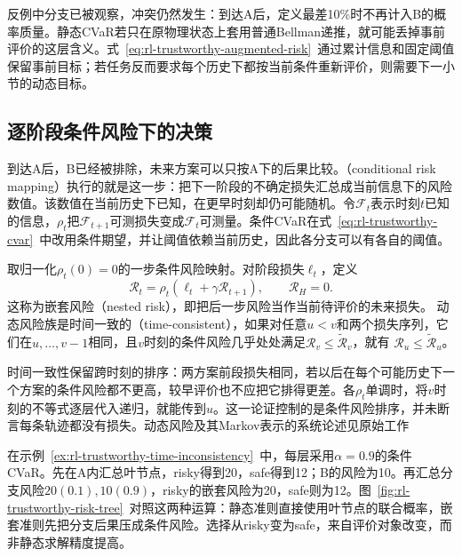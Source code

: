 反例中分支已被观察，冲突仍然发生：到达A后，定义最差10\%时不再计入B的概率质量。静态CVaR若只在原物理状态上套用普通Bellman递推，就可能丢掉事前评价的这层含义。式~\eqref{eq:rl-trustworthy-augmented-risk}~通过累计信息和固定阈值保留事前目标；若任务反而要求每个历史下都按当前条件重新评价，则需要下一小节的动态目标。

\subsection{逐阶段条件风险下的决策}
\label{sec:rl-trustworthy-dynamic-risk}

到达A后，B已经被排除，未来方案可以只按A下的后果比较。（conditional risk mapping）执行的就是这一步：把下一阶段的不确定损失汇总成当前信息下的风险数值。该数值在当前历史下已知，在更早时刻却仍可能随机。令$\mathcal F_t$表示时刻$t$已知的信息，$\rho_t$把$\mathcal F_{t+1}$可测损失变成$\mathcal F_t$可测量。条件CVaR在式~\eqref{eq:rl-trustworthy-cvar}~中改用条件期望，并让阈值依赖当前历史，因此各分支可以有各自的阈值。

\begin{definition}[嵌套风险与时间一致性]
  \label{def:rl-trustworthy-time-consistency}
  取归一化$\rho_t(0)=0$的一步条件风险映射。对阶段损失$\ell_t$，定义
  \[
    \mathcal R_t
      =\rho_t(\ell_t+\gamma\mathcal R_{t+1}),
      \qquad \mathcal R_H=0.
  \]
  这称为嵌套风险（nested risk），即把后一步风险当作当前待评价的未来损失。
  动态风险族是时间一致的（time-consistent），如果对任意$u<v$和两个损失序列，它们在$u,\ldots,v-1$相同，且$v$时刻的条件风险几乎处处满足$\mathcal R_v\leq\widetilde{\mathcal R}_v$，就有
  $\mathcal R_u\leq\widetilde{\mathcal R}_u$。
\end{definition}

时间一致性保留跨时刻的排序：两方案前段损失相同，若以后在每个可能历史下一个方案的条件风险都不更高，较早评价也不应把它排得更差。各$\rho_t$单调时，将$v$时刻的不等式逐层代入递归，就能传到$u$。这一论证控制的是条件风险排序，并未断言每条轨迹都没有损失。动态风险及其Markov表示的系统论述见原始工作

在示例~\ref{ex:rl-trustworthy-time-inconsistency}~中，每层采用$\alpha=0.9$的条件CVaR。先在A内汇总叶节点，risky得到20，safe得到12；B的风险为10。再汇总分支风险$20(0.1),10(0.9)$，risky的嵌套风险为20，safe则为12。图~\ref{fig:rl-trustworthy-risk-tree}~对照这两种运算：静态准则直接使用叶节点的联合概率，嵌套准则先把分支后果压成条件风险。选择从risky变为safe，来自评价对象改变，而非静态求解精度提高。

